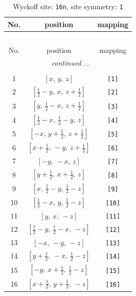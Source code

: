 \documentclass[fleqn,8pt]{jsarticle}
\begin{document}
\begin{longtable}{ccc}
\caption{Wyckoff site: {\tt 16n}, site symmetry: {\tt 1}}
 \\
 \hline \hline
No. & position & mapping \\ \hline \endfirsthead

\multicolumn{2}{l}{\tablename\ \thetable{}} \\
 \hline \hline
No. & position & mapping \\ \hline \endhead

 \hline \hline
\multicolumn{2}{r}{\footnotesize\it continued ...} \\ \endfoot

 \hline \hline
\multicolumn{2}{r}{} \\ \endlastfoot

1 & $\left[ x,\, y,\, z \right]$ & {\tt [1]} \\ \hline
2 & $\left[ \frac{1}{2} - y,\, x,\, z + \frac{1}{2} \right]$ & {\tt [2]} \\ \hline
3 & $\left[ y,\, \frac{1}{2} - x,\, z + \frac{1}{2} \right]$ & {\tt [3]} \\ \hline
4 & $\left[ \frac{1}{2} - x,\, \frac{1}{2} - y,\, z \right]$ & {\tt [4]} \\ \hline
5 & $\left[ - x,\, y + \frac{1}{2},\, z + \frac{1}{2} \right]$ & {\tt [5]} \\ \hline
6 & $\left[ x + \frac{1}{2},\, - y,\, z + \frac{1}{2} \right]$ & {\tt [6]} \\ \hline
7 & $\left[ - y,\, - x,\, z \right]$ & {\tt [7]} \\ \hline
8 & $\left[ y + \frac{1}{2},\, x + \frac{1}{2},\, z \right]$ & {\tt [8]} \\ \hline
9 & $\left[ x,\, \frac{1}{2} - y,\, \frac{1}{2} - z \right]$ & {\tt [9]} \\ \hline
10 & $\left[ \frac{1}{2} - x,\, y,\, \frac{1}{2} - z \right]$ & {\tt [10]} \\ \hline
11 & $\left[ y,\, x,\, - z \right]$ & {\tt [11]} \\ \hline
12 & $\left[ \frac{1}{2} - y,\, \frac{1}{2} - x,\, - z \right]$ & {\tt [12]} \\ \hline
13 & $\left[ - x,\, - y,\, - z \right]$ & {\tt [13]} \\ \hline
14 & $\left[ y + \frac{1}{2},\, - x,\, \frac{1}{2} - z \right]$ & {\tt [14]} \\ \hline
15 & $\left[ - y,\, x + \frac{1}{2},\, \frac{1}{2} - z \right]$ & {\tt [15]} \\ \hline
16 & $\left[ x + \frac{1}{2},\, y + \frac{1}{2},\, - z \right]$ & {\tt [16]} \\
\end{longtable}
\end{document}

